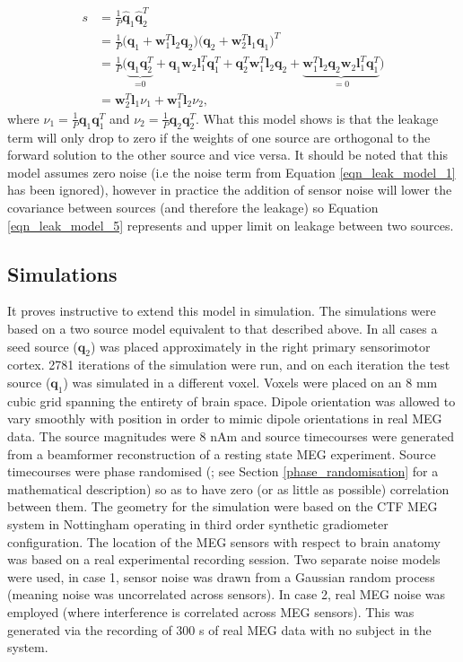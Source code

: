 \begin{equation}
\begin{aligned}
s &= \tfrac{1}{P}\hat{\mathbf{q}}_1\hat{\mathbf{q}}_2^T \\
&= \tfrac{1}{P}\Big(\mathbf{q}_1 + \mathbf{w}_1^T\mathbf{l}_2\mathbf{q}_2\Big)\Big(\mathbf{q}_2 + \mathbf{w}_2^T\mathbf{l}_1\mathbf{q}_1\Big)^T\\
&= \tfrac{1}{P}\Big(\underbrace{\mathbf{q}_1\mathbf{q}_2^T}_\text{=0}+\mathbf{q}_1\mathbf{w}_2\mathbf{l}_1^T\mathbf{q}_1^T+\mathbf{q}_2^T\mathbf{w}_1^T\mathbf{l}_2\mathbf{q}_2+\underbrace{\mathbf{w}_1^T\mathbf{l}_2\mathbf{q}_2\mathbf{w}_2\mathbf{l}_1^T\mathbf{q}_1^T}_{=0}\Big) \\
&=\mathbf{w}_2^T\mathbf{l}_1\nu_1+\mathbf{w}_1^T\mathbf{l}_2\nu_2,
\end{aligned}\label{eqn_leak_model_5}
\end{equation} where $\nu_1=\tfrac{1}{P}\mathbf{q}_1\mathbf{q}_1^T$ and $\nu_2=\tfrac{1}{P}\mathbf{q}_2\mathbf{q}_2^T$. What this model shows is that the leakage term will only drop to zero if the weights of one source are orthogonal to the forward solution to the other source and vice versa. It should be noted that this model assumes zero noise (i.e the noise term from Equation \ref{eqn_leak_model_1} has been ignored), however in practice the addition of sensor noise will lower the covariance between sources (and therefore the leakage) so Equation \ref{eqn_leak_model_5} represents and upper limit on leakage between two sources.

\subsection{Simulations}
It proves instructive to extend this model in simulation. The simulations were based on a two source model equivalent to that described above. In all cases a seed source ($\mathbf{q}_2$) was placed approximately in the right primary sensorimotor cortex. 2781 iterations of the simulation were run, and on each iteration the test source ($\mathbf{q}_1$) was simulated in a different voxel. Voxels were placed on an 8 mm cubic grid spanning the entirety of brain space. Dipole orientation was allowed to vary smoothly with position in order to mimic dipole orientations in real MEG data. The source magnitudes were 8 nAm and source timecourses were generated from a beamformer reconstruction of a resting state MEG experiment. Source timecourses were phase randomised (\citealp{Prichard1994}; see Section \ref{phase_randomisation} for a mathematical description) so as to have zero (or as little as possible) correlation between them. The geometry for the simulation were based on the CTF MEG system in Nottingham operating in third order synthetic gradiometer configuration. The location of the MEG sensors with respect to brain anatomy was based on a real experimental recording session. Two separate noise models were used, in case 1, sensor noise was drawn from a Gaussian random process (meaning noise was uncorrelated across sensors). In case 2, real MEG noise was employed (where interference is correlated across MEG sensors). This was generated via the recording of 300 s of real MEG data with no subject in the system. 

